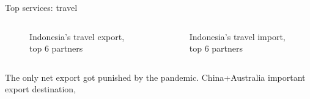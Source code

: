 \documentclass[
  ignorenonframetext,
]{beamer}
\begin{document}
\begin{frame}{Top services: travel}
\label{top-services-travel}
\begin{columns}[T]
\begin{column}{0.47\textwidth}
\begin{figure}


\caption{\label{fig-SX}Indonesia's travel export, top 6 partners}

\end{figure}%
\end{column}

\begin{column}{0.47\textwidth}
\begin{figure}


\caption{\label{fig-SM}Indonesia's travel import, top 6 partners}

\end{figure}%
\end{column}
\end{columns}

The only net export got punished by the pandemic. China+Australia
important export destination,
\end{frame}
\end{document}
